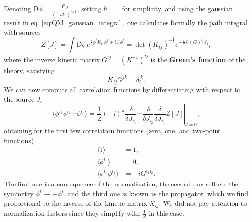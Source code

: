 Denoting \(\mathrm{D}\phi = \frac{\mathrm{d}^n \phi}{(-i2\pi)^{n/2}}\), setting \(\hbar = 1\) for simplicity, and using the gaussian result in eq. \eqref{eq:QM_gaussian_integral}, one calculates formally the path integral with sources
\begin{equation}
    Z[J] = \int \mathrm{D} \phi \, e^{\frac{i}{2} \phi^i K_{ij} \phi^j + i J_i \phi^i} = \det(K_{ij})^{-\frac{1}{2}} e^{-\frac{i}{2} J_i (G)^{ij} J_j},
    \label{eq:generating_functional_free_theory}
\end{equation}
where the inverse kinetic matrix \(G^{ij} = (K^{-1})^{ij}\) is the \textbf{Green's function} of the theory, satisfying
\[
    K_{ij} G^{jk} = \delta_i^{\ k}.
\]
We can now compute all correlation functions by differentiating with respect to the source \(J_i\)
\[
    \langle \phi^{i_1} \phi^{i_2} \cdots \phi^{i_n} \rangle = \left. \frac{1}{Z} \left(-i\right)^n \frac{\delta}{\delta J_{i_n}} \cdots \frac{\delta}{\delta J_{i_2}} \frac{\delta}{\delta J_{i_1}} Z[J] \right|_{J=0},
\]
obtaining for the first few correlation functions (zero, one, and two-point functions)
\[
    \begin{aligned}
        \langle 1 \rangle                     & = 1,              \\
        \langle \phi^{i_1} \rangle            & = 0,              \\
        \langle \phi^{i_1} \phi^{i_2} \rangle & = -i G^{i_1 i_2}.
    \end{aligned}
\]
The first one is a consequence of the normalization, the second one reflects the symmetry \(\phi^i \to -\phi^i\), and the third one is known as the propagator, which we find proportional to the inverse of the kinetic matrix \(K_{ij}\). We did not pay attention to normalization factors since they simplify with \(\frac{1}{Z}\) in this case.


